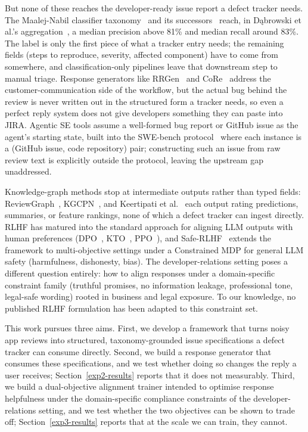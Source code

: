 \documentclass[sigconf, anonymous]{acmart}
\begin{document}
But none of these reaches the developer-ready issue report a defect tracker needs. The
  Maalej-Nabil classifier taxonomy~\cite{maalej2015bug} and its successors~\cite{chen2014ar,
  villarroel2016release, di2017surf, kaur2023bert, shah2020mining} reach, in D{\k a}browski et
  al.'s aggregation~\cite{dkabrowski2022analysing}, a median precision above 81\% and median
  recall around 83\%. The label is only the
  first piece of what a tracker entry needs; the remaining fields (steps to reproduce, severity,
   affected component) have to come from somewhere, and classification-only pipelines leave that
   downstream step to manual triage. Response generators like RRGen~\cite{gao2019automating} and
  CoRe~\cite{gao2021automating} address the customer-communication side of the workflow, but the
  actual bug behind the review is never written out in the structured form a tracker needs, so
  even a perfect reply system does not give developers something they can paste into JIRA.
  Agentic SE tools assume a well-formed bug report or GitHub issue as the agent's starting
  state, built into the SWE-bench protocol~\cite{jimenez2023swe} where each instance is a
  (GitHub issue, code repository) pair; constructing such an issue from raw review text is
  explicitly outside the protocol, leaving the upstream gap unaddressed.

Knowledge-graph methods stop at intermediate outputs rather than typed fields:
  ReviewGraph~\cite{de2025reviewgraph}, KGCPN~\cite{yu2024knowledge}, and Keertipati et
  al.~\cite{keertipati2016approaches} each output rating predictions, summaries, or feature rankings, none
   of which a defect tracker can ingest directly. RLHF has matured into the standard approach
  for aligning LLM outputs with human preferences (DPO~\cite{rafailov2023direct},
  KTO~\cite{ethayarajh2024kto}, PPO~\cite{schulman2017proximal}), and Safe-RLHF~\cite{dai2024safe} extends
  the framework to multi-objective settings under a Constrained MDP for general LLM safety
  (harmfulness, dishonesty, bias). The developer-relations setting poses a different question
  entirely: how to align responses under a domain-specific constraint family (truthful promises,
   no information leakage, professional tone, legal-safe wording) rooted in business and legal
  exposure. To our knowledge, no published RLHF formulation has been adapted to this constraint
  set.

This work pursues three aims. First, we develop a framework that turns noisy app reviews into structured, taxonomy-grounded issue specifications a defect tracker can consume directly. Second, we build a response generator that consumes these specifications, and we test whether doing so changes the reply a user receives; Section~\ref{exp2-results} reports that it does not measurably. Third, we build a dual-objective alignment trainer intended to optimise response helpfulness under the domain-specific compliance constraints of the developer-relations setting, and we test whether the two objectives can be shown to trade off; Section~\ref{exp3-results} reports that at the scale we can train, they cannot.
\end{document}
